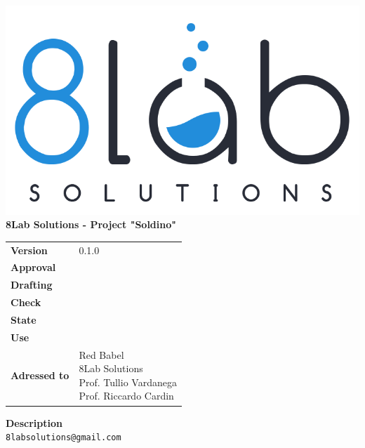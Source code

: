 \thispagestyle{empty}
\begin{titlepage}
	\begin{center}
		\includegraphics[scale = 0.3]{res/images/logo8_crop.png}\\
		\large \textbf{8Lab Solutions - Project "Soldino"} \\
		\vfill
		\Huge \textbf{\doctitle}
		\vspace*{\fill}
        
        \vfill
        \large
    \end{center}
	\begin{table}[htbp]
        \centering
        \hspace*{2cm}
        \begin{tabular}{l|l}
            \textbf{Version} & 0.1.0 \\%
            \textbf{Approval} & \\%
            \textbf{Drafting} & \red{} \\
            \textbf{Check} & \ver{} \\
            \textbf{State} & \stato{} \\
            \textbf{Use} & \uso{} \\
            \textbf{Adressed to} & \parbox[t]{5cm}{Red Babel \\8Lab Solutions
            \\Prof. Tullio Vardanega\\Prof. Riccardo Cardin}
        \end{tabular}
    \end{table}
    \begin{center}
        \vfill
        \normalsize
        \textbf{Description}\\
		\describedoc
        \vfill
        \small
        \texttt{8labsolutions@gmail.com}
	\end{center}
\end{titlepage}
